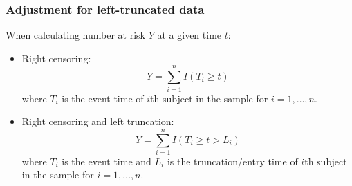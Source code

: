 \documentclass[11pt, aspectratio = 169]{beamer}
\begin{document}

\begin{frame}
  \frametitle{Adjustment for left-truncated data}
  When calculating number at risk $Y$ at a given time $t$:
  \begin{itemize}
    \item Right censoring:
    \begin{equation*}
      Y = \sum_{i = 1}^n I(T_i \ge t)
    \end{equation*}
    where $T_i$ is the event time of $i$th subject in the sample for $i = 1,\dotsc,n$.
    \item Right censoring and left truncation:
    \begin{equation*}
      Y = \sum_{i = 1}^n I(T_i \ge t > L_i)
    \end{equation*}
    where $T_i$ is the event time and $L_i$ is the truncation/entry time of $i$th subject in the sample for $i = 1,\dotsc,n$.
  \end{itemize}
\end{frame}
\end{document}
